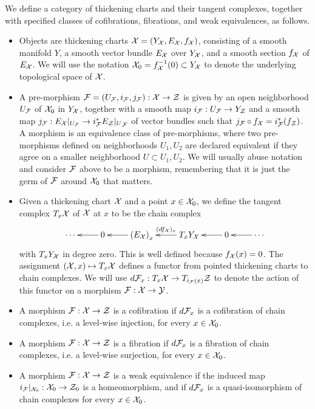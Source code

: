 \begin{definition}\label{thickening-model-structure}
We define a category of thickening charts and their tangent complexes, together with specified classes of cofibrations, fibrations, and weak equivalences, as follows.
\begin{itemize}

\item Objects are thickening charts $\mathcal X = (Y_\mathcal X, E_\mathcal X, f_\mathcal X)$, consisting of a smooth manifold $Y$, a smooth vector bundle $E_\mathcal X$ over $Y_\mathcal X$, and a smooth section $f_\mathcal X$ of $E_\mathcal X$. We will use the notation $\mathcal X_0 = f_\mathcal X^{-1}(0) \subset Y_\mathcal X$ to denote the underlying topological space of $\mathcal X$.

\item A pre-morphism $\mathcal F = (U_\mathcal F, i_\mathcal F, j_\mathcal F): \mathcal X \to \mathcal Z$ is given by an open neighborhood $U_\mathcal F$ of $\mathcal X_0$ in $Y_\mathcal X$, together with a smooth map $i_\mathcal F: U_\mathcal F \to Y_\mathcal Z$ and a smooth map $j_\mathcal F: {E_\mathcal X|_{U_\mathcal F}} \to {i_\mathcal F^* E_\mathcal Z|_{U}}_{\mathcal F}$ of vector bundles such that $j_\mathcal F \circ f_\mathcal X = i_\mathcal F^*(f_\mathcal Z)$. A morphism is an equivalence class of pre-morphisms, where two pre-morphisms defined on neighborhoods $U_1, U_2$ are declared equivalent if they agree on a smaller neighborhood $U \subset U_1, U_2$. We will usually abuse notation and consider $\mathcal F$ above to be a morphism, remembering that it is just the germ of $\mathcal F$ around $\mathcal X_0$ that matters.

\item Given a thickening chart $\mathcal X$ and a point $x \in \mathcal X_0$, we define the tangent complex $T_x \mathcal X$ of $\mathcal X$ at $x$ to be the chain complex
\[\xymatrix{ \cdots & 0 \ar[l] & \left(E_\cX\right)_x \ar[l] & T_x Y_\cX \ar[l]_-{(df_\cX)_x} & 0 \ar[l] & \cdots \ar[l] }\]
with $T_x Y_\mathcal X$ in degree zero. This is well defined because $f_\mathcal X(x) = 0$. The assignment $(\mathcal X, x) \mapsto T_x \mathcal X$ defines a functor from pointed thickening charts to chain complexes. We will use $d \mathcal F_x: T_x \mathcal X \to T_{i_\mathcal F(x)} \mathcal Z$ to denote the action of this functor on a morphism $\mathcal F: \mathcal X \to \mathcal Y$.

\item A morphism $\mathcal F : \mathcal X \to \mathcal Z$ is a cofibration if $d \mathcal F_x$ is a cofibration of chain complexes, i.e. a level-wise injection, for every $x \in \mathcal X_0$.

\item A morphism $\mathcal F : \mathcal X \to \mathcal Z$ is a fibration if $d \mathcal F_x$ is a fibration of chain complexes, i.e. a level-wise surjection, for every $x \in \mathcal X_0$.

\item A morphism $\mathcal F : \mathcal X \to \mathcal Z$ is a weak equivalence if the induced map ${i_\mathcal F|_{\mathcal X_0}}: \mathcal X_0 \to \mathcal Z_0$ is a homeomorphism, and if $d \mathcal F_x$ is a quasi-isomorphism of chain complexes for every $x \in \mathcal X_0$.

\end{itemize}
\end{definition}

